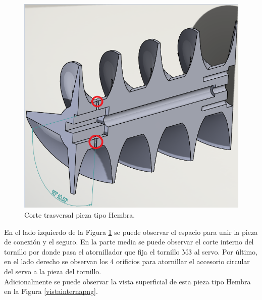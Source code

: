 \begin{figure}[H]
    \begin{center}
    	\includegraphics[scale=0.55]{img/cortetrasversal3.png}
    \end{center}
    \caption{Corte trasversal pieza tipo Hembra. \label{cortetrasversalpng}}
\end{figure}

\vspace{1mm}

En el lado izquierdo de la Figura \ref{cortetrasversalpng} se puede observar el espacio para unir la pieza de conexión y el seguro. En la parte media se puede observar el corte interno del tornillo por donde pasa el atornillador que fija el tornillo M3 al servo. Por último, en el lado derecho se observan los 4 orificios para atornillar el accesorio circular del servo a la pieza del tornillo. \\

Adicionalmente se puede observar la vista superficial de esta pieza tipo Hembra en la Figura \ref{vistainternapng}.

